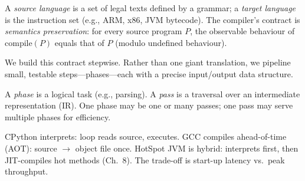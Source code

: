 A \emph{source language} is a set of legal texts defined by a grammar; a \emph{target language} is the instruction set (e.g., ARM, x86, JVM bytecode). The compiler's contract is \emph{semantics preservation}: for every source program $P$, the observable behaviour of $\text{compile}(P)$ equals that of $P$ (modulo undefined behaviour).

We build this contract stepwise. Rather than one giant translation, we pipeline small, testable steps---phases---each with a precise input/output data structure.

\begin{definition}
A \emph{phase} is a logical task (e.g., parsing). A \emph{pass} is a traversal over an intermediate representation (IR). One phase may be one or many passes; one pass may serve multiple phases for efficiency.
\end{definition}

\begin{example}
CPython interprets: loop reads source, executes. GCC compiles ahead-of-time (AOT): source $\to$ object file once. HotSpot JVM is hybrid: interprets first, then JIT-compiles hot methods (Ch.~8). The trade-off is start-up latency vs.\ peak throughput.
\end{example}

